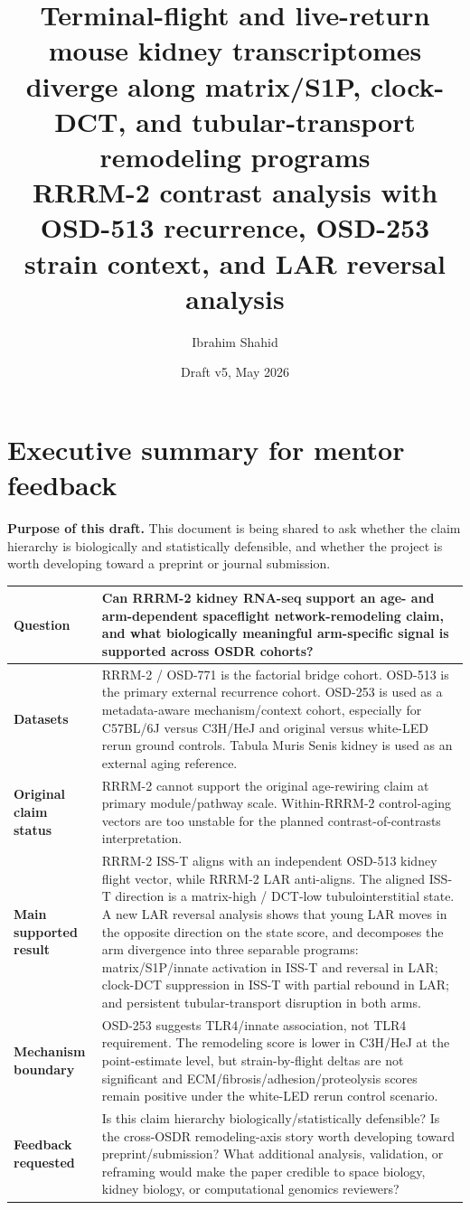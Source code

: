 \documentclass[11pt]{article}
\title{\textbf{Terminal-flight and live-return mouse kidney transcriptomes diverge along matrix/S1P, clock-DCT, and tubular-transport remodeling programs}\\[0.35em]
\large RRRM-2 contrast analysis with OSD-513 recurrence, OSD-253 strain context, and LAR reversal analysis}
\author{Ibrahim Shahid}
\affil{Independent research draft for mentor feedback\\Authorship/collaboration structure pending}
\date{Draft v5, May 2026}
\begin{document}
\maketitle

\section*{Executive summary for mentor feedback}

\noindent\textbf{Purpose of this draft.} This document is being shared to ask whether the claim hierarchy is biologically and statistically defensible, and whether the project is worth developing toward a preprint or journal submission.

\vspace{0.6em}
\small
\begin{tabularx}{\textwidth}{>{\bfseries}p{}X}
\toprule
Question & Can RRRM-2 kidney RNA-seq support an age- and arm-dependent spaceflight network-remodeling claim, and what biologically meaningful arm-specific signal is supported across OSDR cohorts? \\
\midrule
Datasets & RRRM-2 / OSD-771 is the factorial bridge cohort. OSD-513 is the primary external recurrence cohort. OSD-253 is used as a metadata-aware mechanism/context cohort, especially for C57BL/6J versus C3H/HeJ and original versus white-LED rerun ground controls. Tabula Muris Senis kidney is used as an external aging reference. \\
\midrule
Original claim status & RRRM-2 cannot support the original age-rewiring claim at primary module/pathway scale. Within-RRRM-2 control-aging vectors are too unstable for the planned contrast-of-contrasts interpretation. \\
\midrule
Main supported result & RRRM-2 ISS-T aligns with an independent OSD-513 kidney flight vector, while RRRM-2 LAR anti-aligns. The aligned ISS-T direction is a matrix-high / DCT-low tubulointerstitial state. A new LAR reversal analysis shows that young LAR moves in the opposite direction on the state score, and decomposes the arm divergence into three separable programs: matrix/S1P/innate activation in ISS-T and reversal in LAR; clock-DCT suppression in ISS-T with partial rebound in LAR; and persistent tubular-transport disruption in both arms. \\
\midrule
Mechanism boundary & OSD-253 suggests TLR4/innate association, not TLR4 requirement. The remodeling score is lower in C3H/HeJ at the point-estimate level, but strain-by-flight deltas are not significant and ECM/fibrosis/adhesion/proteolysis scores remain positive under the white-LED rerun control scenario. \\
\midrule
Feedback requested & Is this claim hierarchy biologically/statistically defensible? Is the cross-OSDR remodeling-axis story worth developing toward preprint/submission? What additional analysis, validation, or reframing would make the paper credible to space biology, kidney biology, or computational genomics reviewers? \\
\bottomrule
\end{tabularx}
\normalsize
\end{document}

